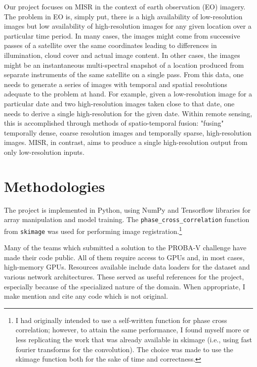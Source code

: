 \documentclass{article}
\begin{document}
Our project focuses on MISR in the context of earth observation (EO) imagery. The problem in EO is, simply put, there is a high availability of low-resolution images but low availability of high-resolution images for any given location over a particular time period. In many cases, the images might come from successive passes of a satellite over the same coordinates leading to differences in illumination, cloud cover and actual image content. In other cases, the images might be an instantaneous multi-spectral snapshot of a location produced from separate instruments of the same satellite on a single pass. From this data, one needs to generate a series of images with temporal and spatial resolutions adequate to the problem at hand. For example, given a low-resolution image for a particular date and two high-resolution images taken close to that date, one needs to derive a single high-resolution for the given date. Within remote sensing, this is accomplished through methods of spatio-temporal fusion: "fusing" temporally dense, coarse resolution images and temporally sparse, high-resolution images. MISR, in contrast, aims to produce a single high-resolution output from only low-resolution inputs.


\section{Methodologies}

The project is implemented in Python, using NumPy and Tensorflow libraries for array manipulation and model training. The \verb|phase_cross_correlation| function from \verb|skimage| was used for performing image registration.\footnote{I had originally intended to use a self-written function for phase cross correlation; however, to attain the same performance, I found myself more or less replicating the work that was already available in skimage (i.e., using fast fourier transforms for the convolution). The choice was made to use the skimage function both for the sake of time and correctness.} 

Many of the teams which submitted a solution to the PROBA-V challenge have made their code public. All of them require access to GPUs and, in most cases, high-memory GPUs. Resources available include data loaders for the dataset and various network architectures. These served as useful references for the project, especially because of the specialized nature of the domain. When appropriate, I make mention and cite any code which is not original.
\end{document}
